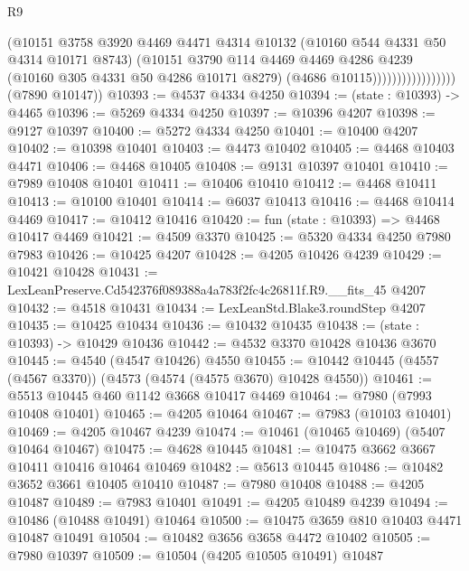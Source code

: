 \begin{lexlean}{R9}
\begin{coremodule}
                                  (@10151
                                    @3758
                                    @3920
                                    @4469
                                    @4471
                                    @4314
                                    @10132
                                    (@10160 @544 @4331 @50 @4314 @10171 @8743)
                                    (@10151
                                      @3790
                                      @114
                                      @4469
                                      @4469
                                      @4286
                                      @4239
                                      (@10160 @305 @4331 @50 @4286 @10171 @8279)
                                      (@4686 @10115)))))))))))))))))
      (@7890 @10147))
@10393 := @4537 @4334 @4250
@10394 := (state : @10393) -> @4465
@10396 := @5269 @4334 @4250
@10397 := @10396 @4207
@10398 := @9127 @10397
@10400 := @5272 @4334 @4250
@10401 := @10400 @4207
@10402 := @10398 @10401
@10403 := @4473 @10402
@10405 := @4468 @10403 @4471
@10406 := @4468 @10405
@10408 := @9131 @10397 @10401
@10410 := @7989 @10408 @10401
@10411 := @10406 @10410
@10412 := @4468 @10411
@10413 := @10100 @10401
@10414 := @6037 @10413
@10416 := @4468 @10414 @4469
@10417 := @10412 @10416
@10420 := fun (state : @10393) => @4468 @10417 @4469
@10421 := @4509 @3370
@10425 := @5320 @4334 @4250 @7980 @7983
@10426 := @10425 @4207
@10428 := @4205 @10426 @4239
@10429 := @10421 @10428
@10431 := LexLeanPreserve.Cd542376f089388a4a783f2fc4c26811f.R9.__fits_45 @4207
@10432 := @4518 @10431
@10434 := LexLeanStd.Blake3.roundStep @4207
@10435 := @10425 @10434
@10436 := @10432 @10435
@10438 := (state : @10393) -> @10429 @10436
@10442 := @4532 @3370 @10428 @10436 @3670
@10445 := @4540 (@4547 @10426) @4550
@10455 := @10442 @10445 (@4557 (@4567 @3370)) (@4573 (@4574 (@4575 @3670) @10428 @4550))
@10461 := @5513 @10445 @460 @1142 @3668 @10417 @4469
@10464 := @7980 (@7993 @10408 @10401)
@10465 := @4205 @10464
@10467 := @7983 (@10103 @10401)
@10469 := @4205 @10467 @4239
@10474 := @10461 (@10465 @10469) (@5407 @10464 @10467)
@10475 := @4628 @10445
@10481 := @10475 @3662 @3667 @10411 @10416 @10464 @10469
@10482 := @5613 @10445
@10486 := @10482 @3652 @3661 @10405 @10410
@10487 := @7980 @10408
@10488 := @4205 @10487
@10489 := @7983 @10401
@10491 := @4205 @10489 @4239
@10494 := @10486 (@10488 @10491) @10464
@10500 := @10475 @3659 @810 @10403 @4471 @10487 @10491
@10504 := @10482 @3656 @3658 @4472 @10402
@10505 := @7980 @10397
@10509 := @10504 (@4205 @10505 @10491) @10487

\end{coremodule}
\end{lexlean}
